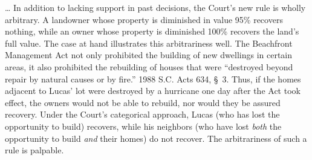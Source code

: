 \ldots
In addition to lacking support in past decisions, the Court's new rule is wholly
arbitrary. A landowner whose property is diminished in value 95\% recovers
nothing, while an owner whose property is diminished 100\% recovers the land's
full value. The case at hand illustrates this arbitrariness well. The Beachfront
Management Act not only prohibited the building of new dwellings in certain
areas, it also prohibited the rebuilding of houses that were ``destroyed beyond
repair by natural causes or by fire.'' 1988 S.C. Acts 634, \S~3. Thus, if the
homes adjacent to Lucas' lot were destroyed by a hurricane one day after the Act
took effect, the owners would not be able to rebuild, nor would they be assured
recovery. Under the Court's categorical approach, Lucas (who has lost the
opportunity to build) recovers, while his neighbors (who have lost \textit{both}
the opportunity to build \textit{and} their homes) do not recover. The
arbitrariness of such a rule is palpable.

